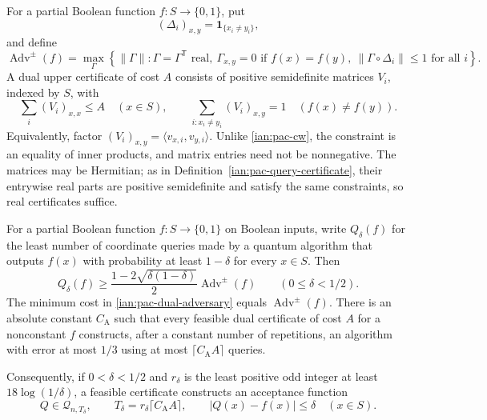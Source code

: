 \begin{definition}
\label{ian:pac-adversary-definition}
For a partial Boolean function \(f:S\to\{0,1\}\), put
\[
 (\Delta_i)_{x,y}=\mathbf1_{\{x_i\ne y_i\}},
\]
and define
\[
 \operatorname{Adv}^{\pm}(f)
  =\max_\Gamma\left\{
       \|\Gamma\|:
       \Gamma=\Gamma^{\mathsf T}\text{ real},\
       \Gamma_{x,y}=0\text{ if }f(x)=f(y),\
       \|\Gamma\circ\Delta_i\|\le1\text{ for all }i
     \right\}.
\]
A dual upper certificate of cost \(A\) consists of positive
semidefinite matrices \(V_i\), indexed by \(S\), with
\[
 \sum_i(V_i)_{x,x}\le A\quad(x\in S),
 \qquad
 \sum_{i:x_i\ne y_i}(V_i)_{x,y}=1
       \quad(f(x)\ne f(y)).
 \tag{32.10}\label{ian:pac-dual-adversary}
\]
Equivalently, factor
\((V_i)_{x,y}=\langle v_{x,i},v_{y,i}\rangle\).
Unlike \eqref{ian:pac-cw}, the constraint is an equality of inner
products, and matrix entries need not be nonnegative.
The matrices may be Hermitian; as in Definition~\ref{ian:pac-query-certificate}, their entrywise real parts are positive semidefinite and satisfy the same constraints, so real certificates suffice.
\end{definition}

\begin{theorem}
\label{ian:pac-adversary-literature}
For a partial Boolean function \(f:S\to\{0,1\}\) on Boolean inputs, write \(Q_\delta(f)\) for the least number of coordinate queries made by a quantum algorithm that outputs \(f(x)\) with probability at least \(1-\delta\) for every \(x\in S\). Then
\[
 Q_\delta(f)\ge
 \frac{1-2\sqrt{\delta(1-\delta)}}2
       \operatorname{Adv}^{\pm}(f)
 \qquad(0\le\delta<1/2).
 \tag{32.11}\label{ian:pac-adversary-lower}
\]
The minimum cost in \eqref{ian:pac-dual-adversary} equals
\(\operatorname{Adv}^{\pm}(f)\).
There is an absolute constant \(C_{\mathrm A}\) such that every
feasible dual certificate of cost \(A\) for a nonconstant \(f\)
constructs, after a constant number of repetitions, an algorithm with error at most \(1/3\) using at most
\(\lceil C_{\mathrm A}A\rceil\) queries.

Consequently, if \(0<\delta<1/2\) and \(r_\delta\) is the least
positive odd integer at least \(18\log(1/\delta)\), a feasible
certificate constructs an acceptance function
\[
 Q\in\mathcal Q_{n,T_\delta},
 \qquad
 T_\delta=r_\delta\lceil C_{\mathrm A}A\rceil,
 \qquad
 |Q(x)-f(x)|\le\delta\quad(x\in S).
 \tag{32.12}\label{ian:pac-adversary-synthesis}
\]
\end{theorem}

